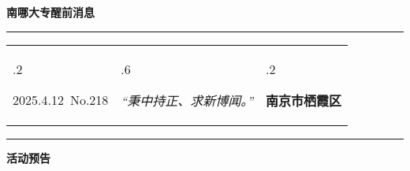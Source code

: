 \documentclass[letterpaper, 12pt]{article}
\begin{document}
\begin{center}
    \Huge\textbf{南哪大专醒前消息}
\end{center}
\vspace{4mm}
\hrule
\renewcommand\tabularxcolumn[1]{m{#1}}
\begin{tabularx}{\textwidth}{>{\hsize.2\hsize}X>{\hsize.6\hsize}X>{\hsize.2\hsize}X}
    \begin{flushleft}
        2025.4.12\, No.218
    \end{flushleft}
    &
    \begin{center}
        \textit{“秉中持正、求新博闻。”}
    \end{center}
    &
    \begin{flushright}
        \textbf{南京市栖霞区}
    \end{flushright}
\end{tabularx}
\vspace{-3.5mm}
\hrule
\vspace{4mm}
\centerline{\huge\textbf{活动预告}}
\end{document}
